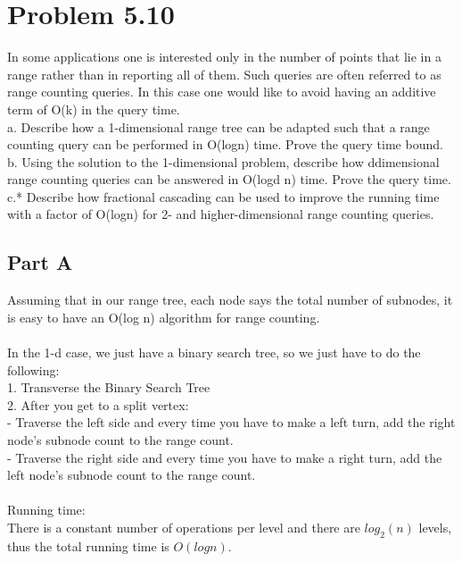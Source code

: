 \documentclass[11pt,psfig]{article}
\begin{document}
\section*{Problem 5.10}
 
In some applications one is interested only in the number of points that
lie in a range rather than in reporting all of them. Such queries are often
referred to as range counting queries. In this case one would like to avoid
having an additive term of O(k) in the query time.\\
a. Describe how a 1-dimensional range tree can be adapted such that a
range counting query can be performed in O(logn) time. Prove the
query time bound.\\
b. Using the solution to the 1-dimensional problem, describe how ddimensional
range counting queries can be answered in O(logd n)
time. Prove the query time.\\
c.* Describe how fractional cascading can be used to improve the running
time with a factor of O(logn) for 2- and higher-dimensional range
counting queries.\\

\subsection*{Part A}

Assuming that in our range tree, each node says the total number of subnodes, it is easy to have an O(log n) algorithm for range counting. \\
\\
In the 1-d case, we just have a binary search tree, so we just have to do the following:\\
1. Transverse the Binary Search Tree\\
2. After you get to a split vertex:\\
- Traverse the left side and every time you have to make a left turn, add the right node's subnode count to the range count. \\
- Traverse the right side and every time you have to make a right turn, add the left node's subnode count to the range count. \\
\\
Running time:\\
There is a constant number of operations per level and there are $log_2(n)$ levels, thus the total running time is $O(log n)$. \\
\\
\end{document}
